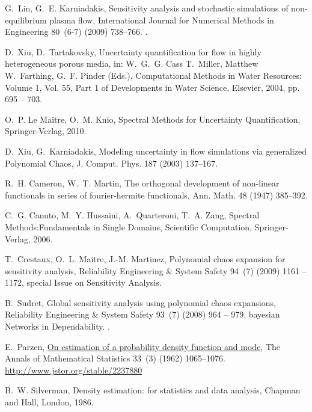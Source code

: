 \documentclass[review,12pt]{elsarticle}
\begin{document}
\begin{thebibliography}{10}
G.~Lin, G.~E. Karniadakis, Sensitivity analysis and stochastic simulations of
  non-equilibrium plasma flow, International Journal for Numerical Methods in
  Engineering 80~(6-7) (2009) 738--766.
\newblock \href {http://dx.doi.org/10.1002/nme.2582}
  {}.

D.~Xiu, D.~Tartakovsky, Uncertainty quantification for flow in highly
  heterogeneous porous media, in: W.~G.~G. Cass T.~Miller, Matthew W.~Farthing,
  G.~F. Pinder (Eds.), Computational Methods in Water Resources: Volume 1, Vol.
  55, Part 1 of Developments in Water Science, Elsevier, 2004, pp. 695 -- 703.

O.~P. {Le Ma\^{i}tre}, O.~M. Knio, Spectral Methods for Uncertainty
  Quantification, Springer-Verlag, 2010.

D.~Xiu, G.~Karniadakis, Modeling uncertainty in flow simulations via
  generalized {Polynomial Chaos}, J. Comput. Phys. 187 (2003) 137--167.

R.~H. Cameron, W.~T. Martin, The orthogonal development of non-linear
  functionals in series of fourier-hermite functionals, Ann. Math. 48 (1947)
  385--392.

C.~G. Canuto, M.~Y. Hussaini, A.~Quarteroni, T.~A. Zang, Spectral
  Methods:Fundamentals in Single Domains, Scientific Computation,
  Springer-Verlag, 2006.

T.~Crestaux, O.~L. Maitre, J.-M. Martinez, Polynomial chaos expansion for
  sensitivity analysis, Reliability Engineering \& System Safety 94~(7) (2009)
  1161 -- 1172, special Issue on Sensitivity Analysis.

B.~Sudret, Global sensitivity analysis using polynomial chaos expansions,
  Reliability Engineering \& System Safety 93~(7) (2008) 964 -- 979, bayesian
  Networks in Dependability.
\newblock \href {http://dx.doi.org/DOI: 10.1016/j.ress.2007.04.002}
  {}.

E.~Parzen, \href{http://www.jstor.org/stable/2237880}{On estimation of a
  probability density function and mode}, The Annals of Mathematical Statistics
  33~(3) (1962) 1065--1076.
\newline\urlprefix\url{http://www.jstor.org/stable/2237880}

B.~W. Silverman, {Density estimation: for statistics and data analysis},
  Chapman and Hall, London, 1986.

\end{thebibliography}
\clearpage
\end{document}
